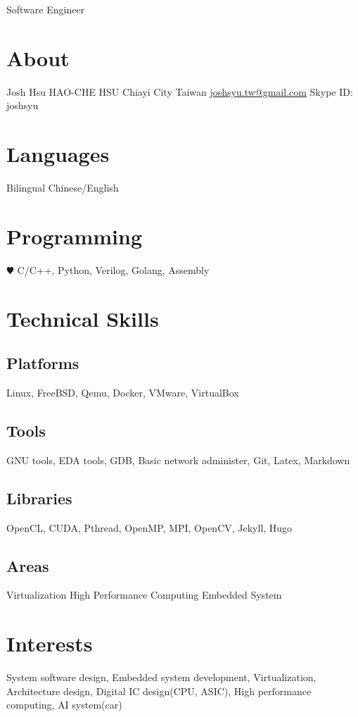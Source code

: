 \documentclass[]{friggeri-cv}
\begin{document}
       {Software Engineer}


\begin{aside}
  \section{About}
    Josh Hsu
    HAO-CHE HSU
	Chiayi City
    Taiwan
	\href{joshsyu.tw@gmail.com}{joshsyu.tw@gmail.com}
	Skype ID: joshsyu
  \section{Languages}
    Bilingual Chinese/English
  \section{Programming}
    {\color{red} $\varheartsuit$} 
	C/C++, Python, Verilog, Golang, Assembly 
  \section{Technical Skills}
  \subsection{Platforms}
	Linux, FreeBSD, Qemu, Docker, VMware, VirtualBox
  \subsection{Tools}
	GNU tools, EDA tools, GDB, Basic network administer, Git, Latex, Markdown
  \subsection{Libraries}
	OpenCL, CUDA, Pthread, OpenMP, MPI, OpenCV, Jekyll, Hugo
  \subsection{Areas}
	Virtualization
	High Performance Computing
	Embedded System
\end{aside}

\section{Interests}

System software design, Embedded system development,
Virtualization, Architecture design, Digital IC design(CPU, ASIC), 
High performance computing, AI system(car)
\end{document}
